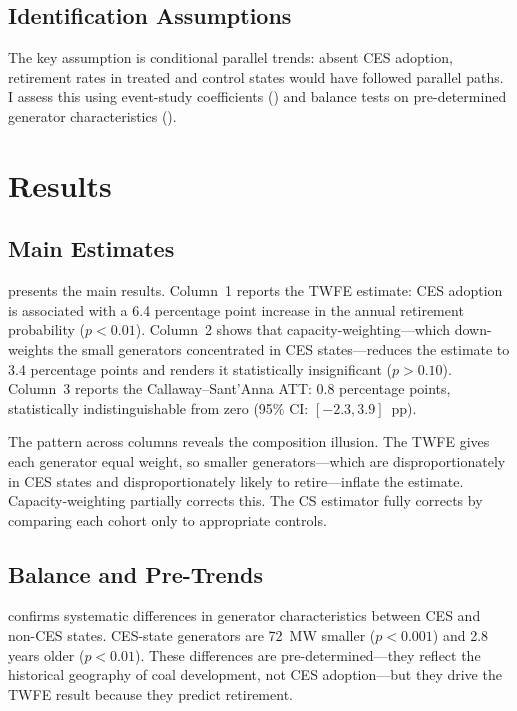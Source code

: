\documentclass[12pt]{article}
\begin{document}
\subsection{Identification Assumptions}

The key assumption is conditional parallel trends: absent CES adoption, retirement rates in treated and control states would have followed parallel paths. I assess this using event-study coefficients () and balance tests on pre-determined generator characteristics ().


\section{Results}\label{sec:results}

\subsection{Main Estimates}

 presents the main results. Column~1 reports the TWFE estimate: CES adoption is associated with a 6.4 percentage point increase in the annual retirement probability ($p < 0.01$). Column~2 shows that capacity-weighting---which down-weights the small generators concentrated in CES states---reduces the estimate to 3.4 percentage points and renders it statistically insignificant ($p > 0.10$). Column~3 reports the Callaway--Sant'Anna ATT: 0.8 percentage points, statistically indistinguishable from zero (95\% CI: $[-2.3, 3.9]$~pp).



The pattern across columns reveals the composition illusion. The TWFE gives each generator equal weight, so smaller generators---which are disproportionately in CES states and disproportionately likely to retire---inflate the estimate. Capacity-weighting partially corrects this. The CS estimator fully corrects by comparing each cohort only to appropriate controls.

\subsection{Balance and Pre-Trends}

 confirms systematic differences in generator characteristics between CES and non-CES states. CES-state generators are 72~MW smaller ($p < 0.001$) and 2.8 years older ($p < 0.01$). These differences are pre-determined---they reflect the historical geography of coal development, not CES adoption---but they drive the TWFE result because they predict retirement.
\end{document}
